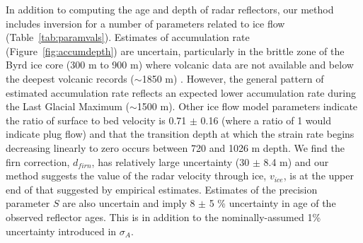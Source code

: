 In addition to computing the age and depth of radar reflectors, our method includes inversion for a number of parameters related to ice flow (Table~\ref{tab:paramvals}). Estimates of accumulation rate (Figure~\ref{fig:accumdepth}) are uncertain, particularly in the brittle zone of the Byrd ice core (300 m to 900 m) where volcanic data are not available and below the deepest volcanic records ($\sim$1850 m) \citep{hammer1997}. However, the general pattern of estimated accumulation rate reflects an expected lower accumulation rate during the Last Glacial Maximum ($\sim$1500 m). Other ice flow model parameters indicate the ratio of surface to bed velocity is 0.71 $\pm$ 0.16 (where a ratio of 1 would indicate plug flow) and that the transition depth at which the strain rate begins decreasing linearly to zero occurs between 720 and 1026 m depth. We find the firn correction, $d_{firn}$, has relatively large uncertainty (30 $\pm$ 8.4 m) and our method suggests the value of the radar velocity through ice, $v_{ice}$, is at the upper end of that suggested by empirical estimates. Estimates of the precision parameter $S$ are also uncertain and imply 8 $\pm$ 5 \% uncertainty in age of the observed reflector ages. This is in addition to the nominally-assumed 1\% uncertainty introduced in $\sigma_{A}$.








